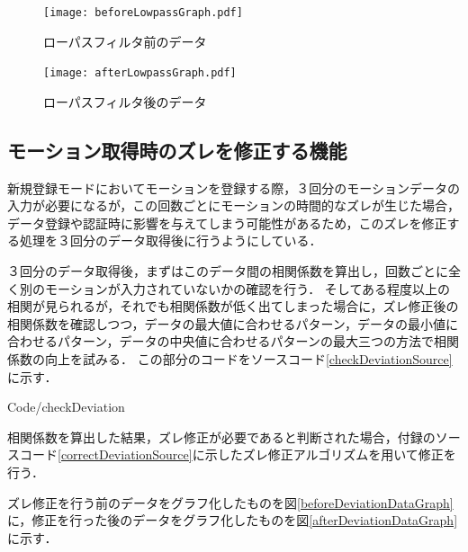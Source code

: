 \documentclass[11pt]{jreport}
\renewcommand{\slash}{/}
\begin{document}
        \begin{figure}[htbp]
            \begin{minipage}{0.5\hsize}
                \begin{center}
                    \texttt{[image: beforeLowpassGraph.pdf]}
                \end{center}
                \caption{ローパスフィルタ前のデータ}
                \label{beforeLowpassDataGraph}
            \end{minipage}
            \begin{minipage}{0.5\hsize}
                \begin{center}
                    \texttt{[image: afterLowpassGraph.pdf]}
                \end{center}
                \caption{ローパスフィルタ後のデータ}
                \label{afterLowpassDataGraph}
            \end{minipage}
        \end{figure}

        \subsection{モーション取得時のズレを修正する機能}
        新規登録モードにおいてモーションを登録する際，３回分のモーションデータの入力が必要になるが，この回数ごとにモーションの時間的なズレが生じた場合，データ登録や認証時に影響を与えてしまう可能性があるため，このズレを修正する処理を３回分のデータ取得後に行うようにしている．

        ３回分のデータ取得後，まずはこのデータ間の相関係数を算出し，回数ごとに全く別のモーションが入力されていないかの確認を行う．
        そしてある程度以上の相関が見られるが，それでも相関係数が低く出てしまった場合に，ズレ修正後の相関係数を確認しつつ，データの最大値に合わせるパターン，データの最小値に合わせるパターン，データの中央値に合わせるパターンの最大三つの方法で相関係数の向上を試みる．
        この部分のコードをソースコード\ref{checkDeviationSource}に示す．

        
        {Code\slash checkDeviation}

        相関係数を算出した結果，ズレ修正が必要であると判断された場合，付録のソースコード\ref{correctDeviationSource}に示したズレ修正アルゴリズムを用いて修正を行う．

        ズレ修正を行う前のデータをグラフ化したものを図\ref{beforeDeviationDataGraph}に，修正を行った後のデータをグラフ化したものを図\ref{afterDeviationDataGraph}に示す．
\end{document}
